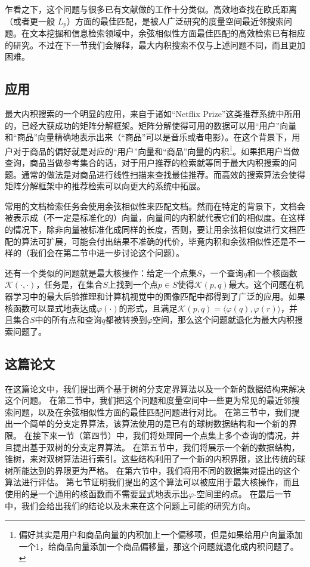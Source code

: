 \documentclass[twocolumn]{article}
\begin{document}
乍看之下，这个问题与很多已有文献做的工作十分类似。高效地查找在欧氏距离（或者更一般 $L_p$）方面的最佳匹配，是被人广泛研究的度量空间最近邻搜索问题\cite{9}。在文本挖掘和信息检索领域中，余弦相似性方面最佳匹配的高效检索已有相应的研究\cite{1}。不过在下一节我们会解释，最大内积搜索不仅与上述问题不同，而且更加困难。

\subsection{应用}
最大内积搜索的一个明显的应用，来自于诸如“Netflix Prize”\cite{22, 21, 2}这类推荐系统中所用的，已经大获成功的矩阵分解框架。矩阵分解使得可用的数据可以用“用户”向量和“商品”向量精确地表示出来（“商品”可以是音乐或者电影）。在这个背景下，用户对于商品的偏好就是对应的“用户”向量和“商品”向量的内积\footnote{偏好其实是用户和商品向量的内积加上一个偏移项，但是如果给用户向量添加一个1，给商品向量添加一个商品偏移量，那这个问题就退化成内积问题了。}。如果把用户当做查询，商品当做参考集合的话，对于用户推荐的检索就等同于最大内积搜索的问题。通常的做法是对商品进行线性扫描来查找最佳推荐。而高效的搜索算法会使得矩阵分解框架中的推荐检索可以向更大的系统中拓展。

常用的文档检索任务会使用余弦相似性来匹配文档。然而在特定的背景下\cite{11}，文档会被表示成（不一定是标准化的）向量，向量间的内积就代表它们的相似度。在这样的情况下，除非向量被标准化成同样的长度，否则，要让用余弦相似度进行文档匹配的算法\cite{1}可扩展，可能会付出结果不准确的代价，毕竟内积和余弦相似性还是不一样的（我们会在第二节中进一步讨论这个问题）。

还有一个类似的问题就是最大核操作：给定一个点集$S$，一个查询$q$和一个核函数$\mathcal{K}(\cdot,\cdot)$，任务是，在集合$S$上找到一个点$p \in S$使得$\mathcal{K}(p,q)$最大。这个问题在机器学习中的最大后验推理\cite{20}和计算机视觉中的图像匹配\cite{23}中都得到了广泛的应用。如果核函数可以显式地表达成$\varphi(\cdot)$的形式，且满足$\mathcal{K}(p,q) = \langle \varphi(q), \varphi(r) \rangle$，并且集合$S$中的所有点和查询$q$都被转换到$\varphi$空间，那么这个问题就退化为最大内积搜索问题了。

\subsection{这篇论文}
在这篇论文中，我们提出两个基于树的分支定界算法以及一个新的数据结构来解决这个问题。
在第二节中，我们把这个问题和度量空间中一些更为常见的最近邻搜索问题，以及在余弦相似性方面的最佳匹配问题进行对比。
在第三节中，我们提出一个简单的分支定界算法，该算法使用的是已有的球树数据结构\cite{28}和一个新的界限。
在接下来一节（第四节）中，我们将处理同一个点集上多个查询的情况，并且提出基于双树的分支定界算法。
在第五节中，我们将展示一个新的数据结构，锥树，来对双树算法进行索引。这些结构利用了一个新的内积界限，这比传统的球树所能达到的界限更为严格。
在第六节中，我们将用不同的数据集对提出的这个算法进行评估。
第七节证明我们提出的这个算法可以被应用于最大核操作，而且使用的是一个通用的核函数而不需要显式地表示出$\varphi$-空间里的点。
在最后一节中，我们会给出我们的结论以及未来在这个问题上可能的研究方向。
\end{document}

